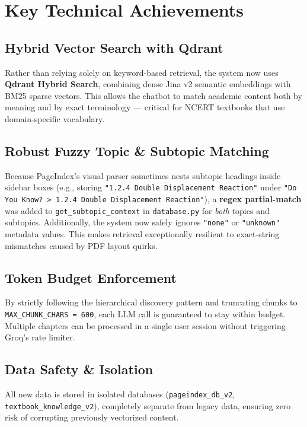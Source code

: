 \documentclass[12pt, a4paper]{article}
\begin{document}
\section{Key Technical Achievements}

\subsection{Hybrid Vector Search with Qdrant}
Rather than relying solely on keyword-based retrieval, the system now uses \textbf{Qdrant Hybrid Search}, combining dense Jina v2 semantic embeddings with BM25 sparse vectors. This allows the chatbot to match academic content both by meaning and by exact terminology — critical for NCERT textbooks that use domain-specific vocabulary.

\subsection{Robust Fuzzy Topic \& Subtopic Matching}
Because PageIndex's visual parser sometimes nests subtopic headings inside sidebar boxes (e.g., storing \texttt{"1.2.4 Double Displacement Reaction"} under \texttt{"Do You Know? > 1.2.4 Double Displacement Reaction"}), a \textbf{regex partial-match} was added to \texttt{get\_subtopic\_context} in \texttt{database.py} for \textit{both} topics and subtopics. Additionally, the system now safely ignores \texttt{"none"} or \texttt{"unknown"} metadata values. This makes retrieval exceptionally resilient to exact-string mismatches caused by PDF layout quirks.

\subsection{Token Budget Enforcement}
By strictly following the hierarchical discovery pattern and truncating chunks to \texttt{MAX\_CHUNK\_CHARS = 600}, each LLM call is guaranteed to stay within budget. Multiple chapters can be processed in a single user session without triggering Groq's rate limiter.

\subsection{Data Safety \& Isolation}
All new data is stored in isolated databases (\texttt{pageindex\_db\_v2}, \texttt{textbook\_knowledge\_v2}), completely separate from legacy data, ensuring zero risk of corrupting previously vectorized content.
\end{document}
